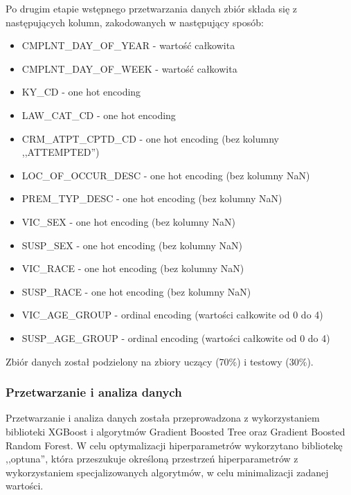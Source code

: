 \documentclass{classrep}
\begin{document}
{{{                Po drugim etapie wstępnego przetwarzania danych zbiór składa się z następujących kolumn, zakodowanych w następujący sposób:
                \begin{itemize}
                    \item CMPLNT\_DAY\_OF\_YEAR - wartość całkowita
                    \item CMPLNT\_DAY\_OF\_WEEK - wartość całkowita
                    \item KY\_CD - one hot encoding
                    \item LAW\_CAT\_CD - one hot encoding
                    \item CRM\_ATPT\_CPTD\_CD - one hot encoding (bez kolumny ,,ATTEMPTED'')
                    \item LOC\_OF\_OCCUR\_DESC - one hot encoding (bez kolumny NaN)
                    \item PREM\_TYP\_DESC - one hot encoding (bez kolumny NaN)
                    \item VIC\_SEX - one hot encoding (bez kolumny NaN)
                    \item SUSP\_SEX - one hot encoding (bez kolumny NaN)
                    \item VIC\_RACE - one hot encoding (bez kolumny NaN)
                    \item SUSP\_RACE - one hot encoding (bez kolumny NaN)
                    \item VIC\_AGE\_GROUP - ordinal encoding (wartości całkowite od 0 do 4)
                    \item SUSP\_AGE\_GROUP - ordinal encoding (wartości całkowite od 0 do 4)
                \end{itemize}
                
                Zbiór danych został podzielony na zbiory uczący (70\%) i testowy (30\%).
            }

            \subsubsection{Przetwarzanie i analiza danych} {
                Przetwarzanie i analiza danych została przeprowadzona z wykorzystaniem biblioteki XGBoost i algorytmów Gradient Boosted Tree oraz Gradient Boosted Random Forest. W celu optymalizacji hiperparametrów wykorzytano bibliotekę ,,optuna'', która przeszukuje określoną przestrzeń hiperparametrów z wykorzystaniem specjalizowanych algorytmów, w celu minimalizacji zadanej wartości.
                
}}}
\end{document}
